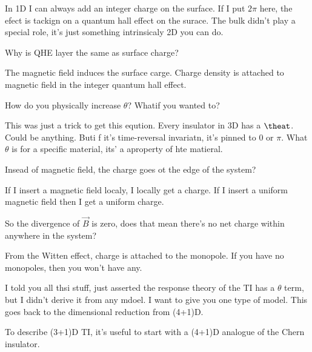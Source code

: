 In 1D I can always add an integer charge on the surface.
If I put $2\pi$ here,
the efect is tackign on a quantum hall effect on the surace.
The bulk didn't play a special role,
it's just something intrinsicaly 2D you can do.

\begin{question}
    Why is QHE layer the same as surface charge?
\end{question}
The magnetic field induces the surface carge.
Charge density is attached to magnetic field in the integer quantum hall effect.

\begin{question}
    How do you physically increase $\theta$?
    Whatif you wanted to?
\end{question}
This was just a trick to get this eqution.
Every insulator in 3D has a $\theat$.
Could be anything.
Buti f it's time-reversal invariatn,
it's pinned to $0$ or $\pi$.
What $\theta$ is for a specific material,
its' a aproperty of hte matieral.

\begin{question}
    Insead of magnetic field, the charge goes ot the edge of the system?
\end{question}
If I insert a magnetic field localy,
I locally get a charge.
If I insert a uniform magnetic field then I get a uniform charge.

\begin{question}
    So the divergence of $\vec{B}$ is zero,
    does that mean there's no net charge within anywhere in the system?
\end{question}
From the Witten effect,
charge is attached to the monopole.
If you have no monopoles,
then you won't have any.

I told you all thsi stuff,
just asserted the response theory of the TI  has a $\theta$ term,
but I didn't derive it from any mdoel.
I want to give you one type of model.
This goes back to the dimensional reduction from (4+1)D.

To describe (3+1)D TI,
it's useful to start with a (4+1)D analogue of the Chern insulator.


